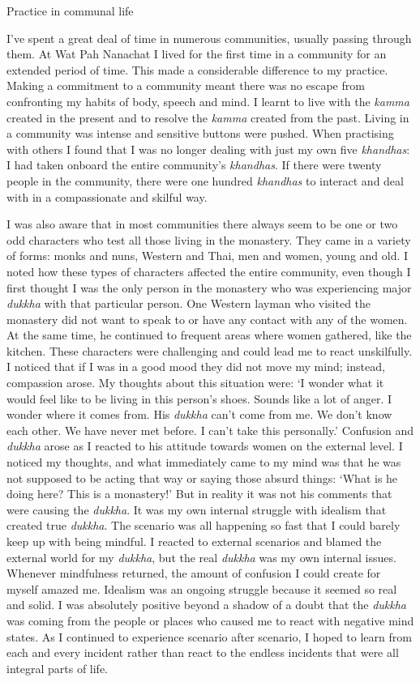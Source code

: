 Practice in communal life

I've spent a great deal of time in numerous communities, usually passing
through them. At Wat Pah Nanachat I lived for the first time in a
community for an extended period of time. This made a considerable
difference to my practice. Making a commitment to a community meant
there was no escape from confronting my habits of body, speech and mind. 
I learnt to live with the \emph{kamma} created in the present and to
resolve the \emph{kamma} created from the past. Living in a community
was intense and sensitive buttons were pushed. When practising with
others I found that I was no longer dealing with just my own five
\emph{khandhas}: I had taken onboard the entire community's
\emph{khandhas}. If there were twenty people in the community, there
were one hundred \emph{khandhas} to interact and deal with in a
compassionate and skilful way. 

I was also aware that in most communities there always seem to be one or
two odd characters who test all those living in the monastery. They came
in a variety of forms: monks and nuns, Western and Thai, men and women, 
young and old. I noted how these types of characters affected the entire
community, even though I first thought I was the only person in the
monastery who was experiencing major \emph{dukkha} with that particular
person. One Western layman who visited the monastery did not want to
speak to or have any contact with any of the women. At the same time, he
continued to frequent areas where women gathered, like the kitchen. 
These characters were challenging and could lead me to react
unskilfully. I noticed that if I was in a good mood they did not move my
mind; instead, compassion arose. My thoughts about this situation were: 
`I wonder what it would feel like to be living in this person's shoes. 
Sounds like a lot of anger. I wonder where it comes from. His
\emph{dukkha} can't come from me. We don't know each other. We have
never met before. I can't take this personally.' Confusion and
\emph{dukkha} arose as I reacted to his attitude towards women on the
external level. I noticed my thoughts, and what immediately came to my
mind was that he was not supposed to be acting that way or saying those
absurd things: `What is he doing here? This is a monastery!' But in
reality it was not his comments that were causing the \emph{dukkha}. It
was my own internal struggle with idealism that created true
\emph{dukkha}. The scenario was all happening so fast that I could
barely keep up with being mindful. I reacted to external scenarios and
blamed the external world for my \emph{dukkha}, but the real
\emph{dukkha} was my own internal issues. Whenever mindfulness returned, 
the amount of confusion I could create for myself amazed me. Idealism
was an ongoing struggle because it seemed so real and solid. I was
absolutely positive beyond a shadow of a doubt that the \emph{dukkha}
was coming from the people or places who caused me to react with
negative mind states. As I continued to experience scenario after
scenario, I hoped to learn from each and every incident rather than
react to the endless incidents that were all integral parts of life. 

